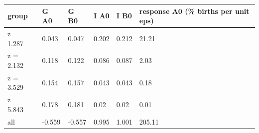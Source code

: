 \begingroup\small
\setlength{\tabcolsep}{3pt}
\renewcommand{\arraystretch}{1.04}
\begin{tabularx}{\linewidth}{XXXXXX}
\toprule
group & G A0 & G B0 & I A0 & I B0 & response A0 (\% births per unit eps) \\
\midrule
z = 1.287 & 0.043 & 0.047 & 0.202 & 0.212 & 21.21 \\
z = 2.132 & 0.118 & 0.122 & 0.086 & 0.087 & 2.03 \\
z = 3.529 & 0.154 & 0.157 & 0.043 & 0.043 & 0.18 \\
z = 5.843 & 0.178 & 0.181 & 0.02 & 0.02 & 0.01 \\
all & -0.559 & -0.557 & 0.995 & 1.001 & 205.11 \\
\bottomrule
\end{tabularx}
\endgroup
